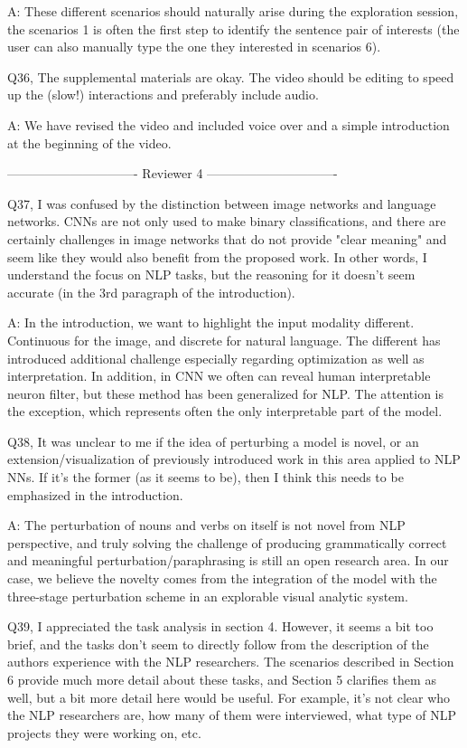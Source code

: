 A: These different scenarios should naturally arise during the exploration session, the scenarios 1 is often the first step to identify the sentence pair of interests (the user can also manually type the one they interested in scenarios 6).

Q36, The supplemental materials are okay. The video should be editing to speed up the (slow!) interactions and preferably include audio.

A: We have revised the video and included voice over and a simple introduction at the beginning of the video.


------------------------------- Reviewer 4 -------------------------------

Q37, I was confused by the distinction between image networks and language networks. CNNs are not only used to make binary classifications, and there are certainly challenges in image networks that do not provide "clear meaning" and seem like they would also benefit from the proposed work. In other words, I understand the focus on NLP tasks, but the reasoning for it doesn't seem accurate (in the 3rd paragraph of the introduction).

A: In the introduction, we want to highlight the input modality different. Continuous for the image, and discrete for natural language. The different has introduced additional challenge especially regarding optimization as well as interpretation. In addition, in CNN we often can reveal human interpretable neuron filter, but these method has been generalized for NLP. The attention is the exception, which represents often the only interpretable part of the model.

Q38, It was unclear to me if the idea of perturbing a model is novel, or an extension/visualization of previously introduced work in this area applied to NLP NNs. If it's the former (as it seems to be), then I think this needs to be emphasized in the introduction.

A: The perturbation of nouns and verbs on itself is not novel from NLP perspective, and truly solving the challenge of producing grammatically correct and meaningful perturbation/paraphrasing is still an open research area. In our case, we believe the novelty comes from the integration of the model with the three-stage perturbation scheme in an explorable visual analytic system.

Q39, I appreciated the task analysis in section 4. However, it seems a bit too brief, and the tasks don't seem to directly follow from the description of the authors experience with the NLP researchers. The scenarios described in Section 6 provide much more detail about these tasks, and Section 5 clarifies them as well, but a bit more detail here would be useful. For example, it's not clear who the NLP researchers are, how many of them were interviewed, what type of NLP projects they were working on, etc.

